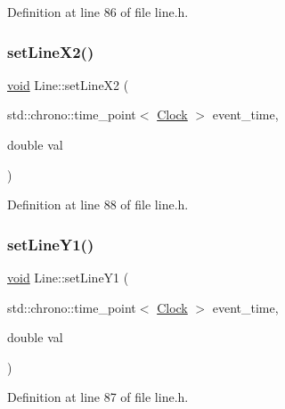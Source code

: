 Definition at line 86 of file line.\+h.

\mbox{\label{class_line_ade959bc4d4f69bb421ed4f69c0d77fb7}} 
\subsubsection{\texorpdfstring{set\+Line\+X2()}{setLineX2()}}
{\footnotesize\ttfamily \mbox{\hyperlink{glad_8h_a950fc91edb4504f62f1c577bf4727c29}{void}} Line\+::set\+Line\+X2 (\begin{DoxyParamCaption}\item[{std\+::chrono\+::time\+\_\+point$<$ \mbox{\hyperlink{universe_8h_a0ef8d951d1ca5ab3cfaf7ab4c7a6fd80}{Clock}} $>$}]{event\+\_\+time,  }\item[{double}]{val }\end{DoxyParamCaption})\hspace{0.3cm}{\ttfamily [inline]}}



Definition at line 88 of file line.\+h.

\mbox{\label{class_line_af236c5ddb0d125b388621b3597266a95}} 
\subsubsection{\texorpdfstring{set\+Line\+Y1()}{setLineY1()}}
{\footnotesize\ttfamily \mbox{\hyperlink{glad_8h_a950fc91edb4504f62f1c577bf4727c29}{void}} Line\+::set\+Line\+Y1 (\begin{DoxyParamCaption}\item[{std\+::chrono\+::time\+\_\+point$<$ \mbox{\hyperlink{universe_8h_a0ef8d951d1ca5ab3cfaf7ab4c7a6fd80}{Clock}} $>$}]{event\+\_\+time,  }\item[{double}]{val }\end{DoxyParamCaption})\hspace{0.3cm}{\ttfamily [inline]}}



Definition at line 87 of file line.\+h.

\mbox{\label{class_line_a671f64c437fe1bef798476d93c675099}} 
